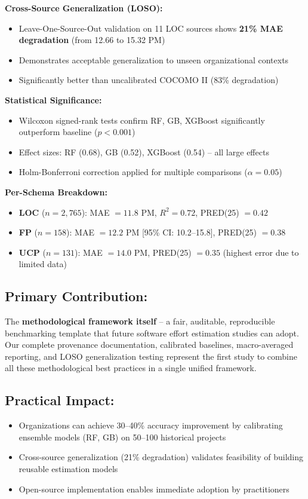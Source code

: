 \documentclass[11pt,a4paper]{article}
\begin{document}
\textbf{Cross-Source Generalization (LOSO):}
\begin{itemize}
    \item Leave-One-Source-Out validation on 11 LOC sources shows \textbf{21\% MAE degradation} (from 12.66 to 15.32 PM)
    \item Demonstrates acceptable generalization to unseen organizational contexts
    \item Significantly better than uncalibrated COCOMO II (83\% degradation)
\end{itemize}

\textbf{Statistical Significance:}
\begin{itemize}
    \item Wilcoxon signed-rank tests confirm RF, GB, XGBoost significantly outperform baseline ($p < 0.001$)
    \item Effect sizes: RF (0.68), GB (0.52), XGBoost (0.54) -- all large effects
    \item Holm-Bonferroni correction applied for multiple comparisons ($\alpha = 0.05$)
\end{itemize}

\textbf{Per-Schema Breakdown:}
\begin{itemize}
    \item \textbf{LOC} ($n = 2,765$): MAE $= 11.8$ PM, $R^2 = 0.72$, PRED(25) $= 0.42$
    \item \textbf{FP} ($n = 158$): MAE $= 12.2$ PM [95\% CI: 10.2--15.8], PRED(25) $= 0.38$
    \item \textbf{UCP} ($n = 131$): MAE $= 14.0$ PM, PRED(25) $= 0.35$ (highest error due to limited data)
\end{itemize}

\subsection*{Primary Contribution:}
The \textbf{methodological framework itself} -- a fair, auditable, reproducible benchmarking template that future software effort estimation studies can adopt. Our complete provenance documentation, calibrated baselines, macro-averaged reporting, and LOSO generalization testing represent the first study to combine all these methodological best practices in a single unified framework.

\subsection*{Practical Impact:}
\begin{itemize}
    \item Organizations can achieve 30--40\% accuracy improvement by calibrating ensemble models (RF, GB) on 50--100 historical projects
    \item Cross-source generalization (21\% degradation) validates feasibility of building reusable estimation models
    \item Open-source implementation enables immediate adoption by practitioners
\end{itemize}
\end{document}
